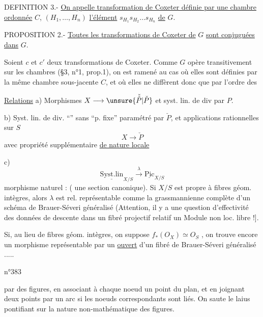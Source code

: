 DEFINITION 3.- \uline{On appelle transformation de Coxeter définie par une chambre ordonnée} $C$, $(H_1,\ldots,H_n)$ \uline{l'élément} $s_{H_1}s_{H_2}\ldots s_{H_n}$ \uline{de} $G$.

PROPOSITION 2.- \uline{Toutes les transformations de Coxeter de} $G$ \uline{sont conjuguées dans} $G$.

Soient $c$ et $c'$ deux transformations de Coxeter. Comme $G$ opère transitivement sur les chambres (§3, n°1, prop.1), on est ramené au cas où elles sont définies par la même chambre sous-jacente $C$, et où elles ne diffèrent donc que par l'ordre des

\uline{Relations} a) Morphismes $X\longrightarrow\unsure{\check{\check{P}}|\check{P}}$ et syst. lin. de div  par $P$.

b) Syst. lin. de div. ``'' sans ``p. fixe'' paramétré par $\check{P}$, et applications rationnelles sur $S$
\[
X\longrightarrow\check{P}
\]
avec  propriété supplémentaire \uline{de nature locale}

c)
\[
\underline{\mathrm{Syst.lin}}_{X/S}\xrightarrow{\lambda}\underline{\mathrm{Pic}}_{X/S}
\]
morphisme naturel : (  une section canonique). Si $X/S$ est propre à fibres géom. intègres, alors $\lambda$ est rel. représentable comme la grassmannienne complète d'un schéma de Brauer-Séveri généralisé (Attention, il y a une question d'effectivité des données de descente dans un fibré projectif relatif un Module non loc. libre !].

Si, au lieu de fibres géom. intègres, on suppose $f_*(O_X)\simeq O_S$ , on trouve encore un morphisme représentable par un \uline{ouvert} d'un fibré  de Brauer-Séveri généralisé .....

\hfill n°383

par des figures, en associant à chaque noeud un point du plan, et en joignant deux points par un arc si les noeuds correspondants sont liés. On saute le laius pontifiant sur la nature non-mathématique des figures.

